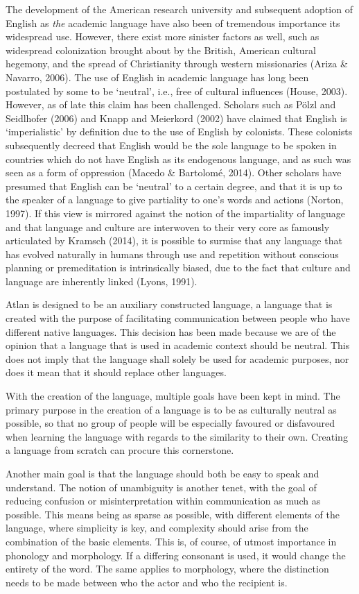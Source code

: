 The development of the American research university and subsequent adoption of English as \textit{the} academic language have also been of tremendous importance its widespread use. However, there exist more sinister factors as well, such as widespread colonization brought about by the British, American cultural hegemony, and the spread of Christianity through western missionaries (Ariza \& Navarro, 2006). The use of English in academic language has long been postulated by some to be ‘neutral’, i.e., free of cultural influences (House, 2003). However, as of late this claim has been challenged. Scholars such as Pölzl and Seidlhofer (2006) and Knapp and Meierkord (2002) have claimed that English is ‘imperialistic’ by definition due to the use of English by colonists. These colonists subsequently decreed that English would be the sole language to be spoken in countries which do not have English as its endogenous language, and as such was seen as a form of oppression (Macedo \& Bartolomé, 2014). Other scholars have presumed that English can be ‘neutral’ to a certain degree, and that it is up to the speaker of a language to give partiality to one’s words and actions (Norton, 1997). If this view is mirrored against the notion of the impartiality of language and that language and culture are interwoven to their very core as famously articulated by Kramsch (2014), it is possible to surmise that any language that has evolved naturally in humans through use and repetition without conscious planning or premeditation is intrinsically biased, due to the fact that culture and language are inherently linked (Lyons, 1991). 

Atlan is designed to be an auxiliary constructed language, a language that is created with the purpose of facilitating communication between people who have different native languages. This decision has been made because we are of the opinion that a language that is used in academic context should be neutral. This does not imply that the language shall solely be used for academic purposes, nor does it mean that it should replace other languages. 

With the creation of the language, multiple goals have been kept in mind. The primary purpose in the creation of a language is to be as culturally neutral as possible, so that no group of people will be especially favoured or disfavoured when learning the language with regards to the similarity to their own. Creating a language from scratch can procure this cornerstone. 

Another main goal is that the language should both be easy to speak and understand. The notion of unambiguity is another tenet, with the goal of reducing confusion or misinterpretation within communication as much as possible. This means being as sparse as possible, with different elements of the language, where simplicity is key, and complexity should arise from the combination of the basic elements. This is, of course, of utmost importance in phonology and morphology. If a differing consonant is used, it would change the entirety of the word. The same applies to morphology, where the distinction needs to be made between who the actor and who the recipient is. 

